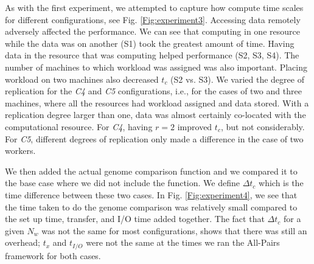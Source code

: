 \documentclass{rspublic}
\begin{document}
As with the first experiment, we attempted to capture how compute time
scales for different configurations, see Fig.
\ref{Fig:experiment3}. Accessing data remotely adversely affected the
performance. We can see that computing in one resource while the data
was on another (S1) took the greatest amount of time. Having data in
the resource that was computing helped performance (S2, S3, S4). The
number of machines to which workload was assigned was also
important. Placing workload on two machines also decreased $t_c$ (S2
vs. S3). We varied the degree of replication for the \textit{C4} and
\textit{C5} configurations, i.e., for the cases of two and three
machines, where all the resources had workload assigned and data
stored. With a replication degree larger than one, data was almost
certainly co-located with the computational resource. For \textit{C4},
having $r = 2$ improved $t_c$, but not considerably.  For \textit{C5},
different degrees of replication only made a difference in the case of
two workers.

We then added the actual genome comparison function and we compared it
to the base case where we did not include the function. We define $\Delta t_c$
which is the time difference between these two cases. In Fig.
\ref{Fig:experiment4}, we see that the time taken to do the genome
comparison was relatively small compared to the set up time, transfer,
and I/O time added together. The fact that $\Delta t_c$ for a given
$N_w$ was not the same for most configurations, shows that there was
still an overhead; $t_x$ and $t_{I/O}$ were not the same at the
times we ran the All-Pairs framework for both cases.
\end{document}
